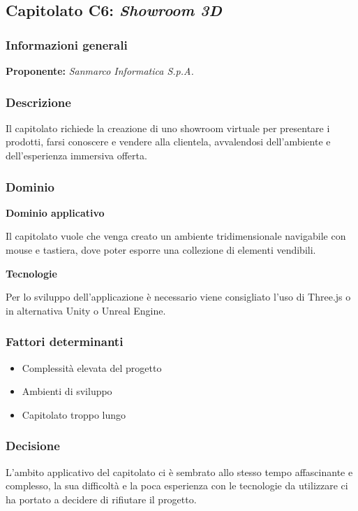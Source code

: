 \subsection{Capitolato C6: \textit{Showroom 3D}}

\subsubsection{Informazioni generali}

\textbf{Proponente:} \textit{Sanmarco Informatica S.p.A.}
\subsubsection{Descrizione}
Il capitolato richiede la creazione di uno showroom virtuale per presentare i prodotti, farsi conoscere e vendere alla clientela, avvalendosi dell’ambiente e dell’esperienza immersiva offerta.  %

\subsubsection{Dominio}

\textbf{Dominio applicativo}

Il capitolato vuole che venga creato un ambiente tridimensionale navigabile con mouse e tastiera, dove poter esporre una collezione di elementi vendibili.

\textbf{Tecnologie}

Per lo sviluppo dell'applicazione è necessario viene consigliato l'uso di Three.js o in alternativa Unity o Unreal Engine.


\subsubsection{Fattori determinanti}
\begin{itemize}
    \item Complessità elevata del progetto
    \item Ambienti di sviluppo
    \item Capitolato troppo lungo
\end{itemize}

\subsubsection{Decisione}
L'ambito applicativo del capitolato ci è sembrato allo stesso tempo affascinante e complesso, la sua difficoltà e la poca esperienza con le tecnologie da utilizzare ci ha portato a decidere di rifiutare il progetto.
